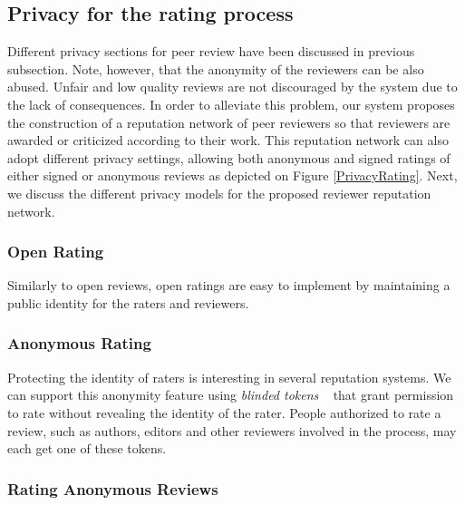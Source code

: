 
\subsection{Privacy for the rating process}
\label{sec:privacyRating}



Different privacy sections for peer review have been discussed in previous
subsection. Note, however, that the anonymity of the reviewers can be also
abused. Unfair and low quality reviews are not discouraged by the system due to
the lack of consequences. In order to alleviate this problem, our system
proposes the construction of a reputation network of peer reviewers so that
reviewers are awarded or criticized according to their work. This reputation
network can also adopt different privacy settings, allowing both anonymous and
signed ratings of either signed or anonymous reviews as depicted on Figure
\ref{PrivacyRating}. Next, we discuss the different privacy models for the
proposed reviewer reputation network.


\subsubsection*{Open Rating}
Similarly to open reviews, open ratings are easy to implement by maintaining a
public identity for the raters and reviewers.

\subsubsection*{Anonymous Rating}

Protecting the identity of raters is interesting in several reputation systems.
We can support this anonymity feature using \emph{blinded tokens}
~\cite{schaub2016trustless} that grant permission to rate without revealing the
identity of the rater. People authorized to rate a review, such as authors,
editors and other reviewers involved in the process, may each get one of these
tokens.

\subsubsection*{Rating Anonymous Reviews}

